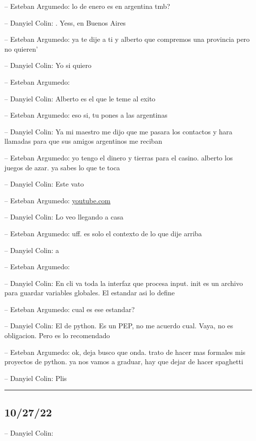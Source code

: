 -- Esteban Argumedo: lo de enero es en argentina tmb?

-- Danyiel Colin: . Yess, en Buenos Aires

-- Esteban Argumedo: ya te dije a ti y alberto que compremos una
provincia pero no quieren'

-- Danyiel Colin: Yo si quiero

-- Esteban Argumedo:

-- Danyiel Colin: Alberto es el que le teme al exito

-- Esteban Argumedo: eso si, tu pones a las argentinas

-- Danyiel Colin: Ya mi maestro me dijo que me pasara los contactos y
hara llamadas para que sus amigos argentinos me reciban

-- Esteban Argumedo: yo tengo el dinero y tierras para el casino.
alberto los juegos de azar. ya sabes lo que te toca

-- Danyiel Colin: Este vato

-- Esteban Argumedo:
\href{https://www.youtube.com/watch?v=DAZ4MTLFePg}{youtube.com}

-- Danyiel Colin: Lo veo llegando a casa

-- Esteban Argumedo: uff. es solo el contexto de lo que dije arriba

-- Danyiel Colin: a

-- Esteban Argumedo:

-- Danyiel Colin: En cli va toda la interfaz que procesa input. init es
un archivo para guardar variables globales. El estandar asi lo define

-- Esteban Argumedo: cual es ese estandar?

-- Danyiel Colin: El de python. Es un PEP, no me acuerdo cual. Vaya, no
es obligacion. Pero es lo recomendado

-- Esteban Argumedo: ok, deja busco que onda. trato de hacer mas
formales mis proyectos de python. ya nos vamos a graduar, hay que dejar
de hacer spaghetti

-- Danyiel Colin: Plis

\begin{center}\rule{0.5\linewidth}{0.5pt}\end{center}

\hypertarget{section-161}{%
\subsection{10/27/22}\label{section-161}}

-- Danyiel Colin:

